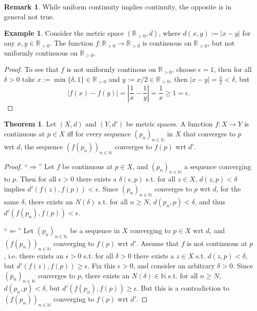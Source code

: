 \documentclass[12pt, a4paper]{article}
\numberwithin{equation}{section}
\theoremstyle{definition}
\theoremstyle{definition}
\newtheorem{exmp}[thm]{Example} %
\newtheorem{remark}[thm]{Remark} %
\newtheorem{theorem}[thm]{Theorem}
\newcommand{\abs}[1]{\left\vert #1 \right\vert}
\newcommand{\seq}[1][\varphi]{\left( #1 \right)_{n \in \mathbb{N}}}
\begin{document}
	\begin{remark}
		While uniform continuity implies continuity, the opposite is in general not true.
	\end{remark}

	\begin{exmp}
		Consider the metric space $(\mathbb R_{> 0}, d)$, where $d(x, y) := \abs{x - y}$ for any $x, y\in\mathbb R_{> 0}$. The function $f: \mathbb R_{>0} \to \mathbb R_{> 0}$ is continuous on $\mathbb R_{> 0}$, but not uniformly continuous on $\mathbb R_{> 0}$. 
	\end{exmp}

	\begin{proof}
		To see that $f$ is not uniformly continous on $\mathbb R_{> 0}$, choose $\epsilon = 1$, then for all $\delta > 0$ take $x := \min\{\delta, 1\}\in\mathbb R_{> 0}$ and $y := x/2\in\mathbb R_{> 0}$, then $\abs{x - y} = \frac{x}{2} < \delta$, but
		$$\abs{f(x) - f(y)} = \abs{\frac{1}{x} - \frac{1}{y}} = \frac{1}{x} \geq 1 = \epsilon.$$
	\end{proof}

	\begin{theorem}
		Let $(X, d)$ and $(Y, d')$ be metric spaces. A function $f: X\to Y$ is continuous at $p\in X$ iff for every sequence $\seq[p_n]$ in $X$ that converges to $p$ wrt $d$, the sequence $\seq[f(p_n)]$ converges to $f(p)$ wrt $d'$.
	\end{theorem}

	\begin{proof}
		\enquote{$\Longrightarrow$} Let $f$ be continuous at $p\in X$, and $\seq[p_n]$ a sequence converging to $p$. Then for all $\epsilon > 0$ there exists a $\delta(\epsilon, p)$ s.t. for all $z\in X$, $d(z, p) < \delta$ implies $d'(f(z), f(p)) < \epsilon$. Since $\seq[p_n]$ converges to $p$ wrt $d$, for the same $\delta$, there exists an $N(\delta)$ s.t. for all $n\geq N$, $d(p_n, p) < \delta$, and thus $d'(f(p_n), f(p)) < \epsilon$.
		
		\enquote{$\Longleftarrow$} Let $\seq[p_n]$ be a sequence in $X$ converging to $p\in X$ wrt $d$, and $\seq[f(p_n)]$ converging to $f(p)$ wrt $d'$. Assume that $f$ is not continuous at $p$, i.e. there exists an $\epsilon > 0$ s.t. for all $\delta > 0$ there exists a $z\in X$ s.t. $d(z, p) < \delta$, but $d'(f(z), f(p)) \geq \epsilon$. Fix this $\epsilon > 0$, and consider an arbitrary $\delta > 0$. Since $\seq[p_n]$ converges to $p$, there exists an $N(\delta)\in\mathbb N$ s.t. for all $n\geq N$, $d(p_n, p) < \delta$, but $d'(f(p_n), f(p)) \geq \epsilon$. But this is a contradiction to $\seq[f(p_n)]$ converging to $f(p)$ wrt $d'$.
	\end{proof}
\end{document}
